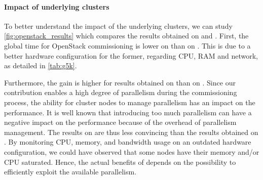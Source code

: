 
\paragraph{Impact of underlying clusters}

%
To better understand the impact of the underlying clusters, we can study
\cref{fig:openstack_results} which compares the results obtained on \ecotype and
\nova. First, the global time for OpenStack commissioning is lower on \ecotype
than on \nova. This is due to a better hardware configuration for the former,
regarding CPU, RAM and network, as detailed in \cref{tab:g5k}.

Furthermore, the gain is higher for results obtained on \ecotype than on \nova.
Since our contribution enables a high degree of parallelism during the
commissioning process, the ability for cluster nodes to manage parallelism has
an impact on the performance.
%
It is well known that introducing too much parallelism can have a negative
impact on the performance because of the overhead of parallelism management.
The results on \nova are thus less convincing than the results obtained on
\ecotype.  By monitoring CPU, memory, and bandwidth usage on an outdated
hardware configuration, we could have observed that some nodes have their memory
and/or CPU saturated.
Hence, the actual benefits of \mad depends on the possibility to efficiently
exploit the available parallelism.
%
%

